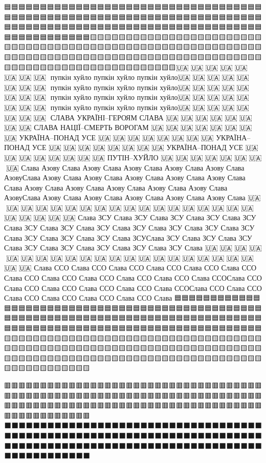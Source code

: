  
 
 
 
 

🟦🟦🟦🟦🟦🟦🟦🟦🟦🟦🟦🟦🟦🟦🟦🟦🟦🟦🟦🟦🟦🟦🟦🟦🟦🟦🟦🟦🟦🟦🟦🟦🟦🟦🟦🟦🟦🟦🟦🟦🟦🟦🟦🟦🟦🟦🟦🟦🟦🟦🟦🟦🟦🟦🟦🟦🟦🟦🟦🟦🟦🟦🟦🟦🟦🟦🟦🟦🟦🟦🟦🟦🟦🟦🟦🟦🟦🟦🟦🟦🟦🟦🟦🟦🟦🟦🟦🟦🟦🟦🟦🟦🟦🟦🟦🟦🟦🟦🟦🟦🟦🟦🟦🟦🟦🟦🟦🟦🟦🟦🟦🟦🟦🟦🟦🟦🟦🟦🟦🟦🟨🟨🟨🟨🟨🟨🟨🟨🟨🟨🟨🟨🟨🟨🟨🟨🟨🟨🟨🟨🟨🟨🟨🟨🟨🟨🟨🟨🟨🟨🟨🟨🟨🟨🟨🟨🟨🟨🟨🟨🟨🟨🟨🟨🟨🟨🟨🟨🟨🟨🟨🟨🟨🟨🟨🟨🟨🟨🟨🟨🟨🟨🟨🟨🟨🟨🟨🟨🟨🟨🟨🟨🟨🟨🟨🟨🟨🟨🟨🟨🟨🟨🟨🟨🟨🟨🟨🟨🟨🟨🟨🟨🟨🟨🟨🟨🟨🟨🟨🟨🟨🟨🟨🟨🟨🟨🟨🟨🟨🟨🟨🟨🟨🟨🟨🟨🟨🟨🟨🟨🇺🇦🔱🇺🇦🔱🇺🇦🔱🇺🇦🔱🇺🇦🔱🇺🇦🔱🇺🇦🔱🇺🇦🔱 пупкін хуйло пупкін хуйло пупкін хуйло🇺🇦🔱🇺🇦🔱🇺🇦🔱🇺🇦🔱🇺🇦🔱🇺🇦🔱🇺🇦🔱🇺🇦🔱 пупкін хуйло пупкін хуйло пупкін хуйло🇺🇦🔱🇺🇦🔱🇺🇦🔱🇺🇦🔱🇺🇦🔱🇺🇦🔱🇺🇦🔱🇺🇦🔱 пупкін хуйло пупкін хуйло пупкін хуйло🇺🇦🔱🇺🇦🔱🇺🇦🔱🇺🇦🔱🇺🇦🔱🇺🇦🔱🇺🇦🔱🇺🇦🔱 пупкін хуйло пупкін хуйло пупкін хуйло🇺🇦🔱🇺🇦🔱🇺🇦🔱🇺🇦🔱🇺🇦🔱🇺🇦🔱🇺🇦🔱🇺🇦🔱
 СЛАВА УКРАЇНІ–ГЕРОЯМ СЛАВА             🇺🇦🔱🇺🇦🔱🇺🇦🔱🇺🇦🔱🇺🇦🔱🇺🇦🔱🇺🇦🔱🇺🇦
СЛАВА НАЦІЇ–СМЕРТЬ ВОРОГАМ
🇺🇦🔱🇺🇦🔱🇺🇦🔱🇺🇦🔱🇺🇦🔱🇺🇦🔱🇺🇦🔱🇺🇦
УКРАЇНА–ПОНАД УСЕ
🇺🇦🔱🇺🇦🔱🇺🇦🔱🇺🇦🔱🇺🇦🔱🇺🇦🔱🇺🇦🔱🇺🇦
УКРАЇНА–ПОНАД УСЕ
🇺🇦🔱🇺🇦🔱🇺🇦🔱🇺🇦🔱🇺🇦🔱🇺🇦🔱🇺🇦🔱🇺🇦
УКРАЇНА–ПОНАД УСЕ
🇺🇦🔱🇺🇦🔱🇺🇦🔱🇺🇦🔱🇺🇦🔱🇺🇦🔱🇺🇦🔱🇺🇦
ПУТІН–ХУЙЛО
🇺🇦🔱🇺🇦🔱🇺🇦🔱🇺🇦🔱🇺🇦🔱🇺🇦🔱🇺🇦🔱🇺🇦
Слава Азову Слава Азову  Слава Азову Слава Азову Слава Азову Слава АзовуСлава Азову Слава Азову Слава Азову Слава Азову Слава Азову Слава Слава Азову Слава Азову Слава Азову Слава Азову Слава Азову Слава АзовуСлава Азову Слава Азову Слава Азову Слава Азову Слава Азову Слава
🇺🇦🔱🇺🇦🔱🇺🇦🔱🇺🇦🔱🇺🇦🔱🇺🇦🔱🇺🇦🔱🇺🇦🔱🇺🇦🔱🇺🇦🔱🇺🇦🔱🇺🇦🔱🇺🇦🔱🇺🇦🔱🇺🇦🔱🇺🇦🔱🇺🇦🔱🇺🇦🔱🇺🇦🔱🇺🇦🔱🇺🇦🔱🇺🇦🔱🇺🇦
Слава ЗСУ Слава ЗСУ Слава ЗСУ Слава ЗСУ Слава ЗСУ Слава ЗСУ Слава ЗСУ Слава ЗСУ Слава ЗСУ Слава ЗСУ Слава ЗСУ Слава ЗСУ Слава ЗСУ Слава ЗСУ Слава ЗСУ Слава ЗСУСлава ЗСУ Слава ЗСУ Слава ЗСУ Слава ЗСУ Слава ЗСУ Слава ЗСУ Слава ЗСУ Слава ЗСУ Слава
🇺🇦🔱🇺🇦🔱🇺🇦🔱🇺🇦🔱🇺🇦🔱🇺🇦🔱🇺🇦🔱🇺🇦🔱🇺🇦🔱🇺🇦🔱🇺🇦🔱🇺🇦🔱🇺🇦🔱🇺🇦🔱🇺🇦🔱🇺🇦🔱🇺🇦🔱🇺🇦🔱🇺🇦🔱🇺🇦🔱🇺🇦🔱🇺🇦🔱🇺🇦
Слава ССО Слава ССО Слава ССО Слава ССО Слава ССО Слава ССО Слава ССО Слава ССО Слава ССО Слава ССО Слава ССО Слава ССОСлава ССО Слава ССО Слава ССО Слава ССО Слава ССО Слава ССОСлава ССО Слава ССО Слава ССО Слава ССО Слава ССО Слава ССО Слава
🟦🟦🟦🟦🟦🟦🟦🟦🟦🟦🟦🟦🟦🟦🟦🟦🟦🟦🟦🟦🟦🟦🟦🟦🟦🟦🟦🟦🟦🟦🟦🟦🟦🟦🟦🟦🟦🟦🟦🟦🟦🟦🟦🟦🟦🟦🟦🟦🟦🟦🟦🟦🟦🟦🟦🟦🟦🟦🟦🟦🟦🟦🟦🟦🟦🟦🟦🟦🟦🟦🟦🟦🟦🟦🟦🟦🟦🟦🟦🟦🟦🟦🟦🟦🟦🟦🟦🟦🟦🟦🟦🟦🟦🟦🟦🟦🟦🟦🟦🟦🟦🟦🟦🟦🟦🟦🟦🟦🟦🟦🟦🟦🟦🟦🟦🟦🟦🟦🟦🟦🟨🟨🟨🟨🟨🟨🟨🟨🟨🟨🟨🟨🟨🟨🟨🟨🟨🟨🟨🟨🟨🟨🟨🟨🟨🟨🟨🟨🟨🟨🟨🟨🟨🟨🟨🟨🟨🟨🟨🟨🟨🟨🟨🟨🟨🟨🟨🟨🟨🟨🟨🟨🟨🟨🟨🟨🟨🟨🟨🟨🟨🟨🟨🟨🟨🟨🟨🟨🟨🟨🟨🟨🟨🟨🟨🟨🟨🟨🟨🟨🟨🟨🟨🟨🟨🟨🟨🟨🟨🟨🟨🟨🟨🟨🟨🟨🟨🟨🟨🟨🟨🟨🟨🟨🟨🟨🟨🟨🟨🟨🟨🟨🟨🟨🟨🟨🟨🟨🟨🟨

🟥🟥🟥🟥🟥🟥🟥🟥🟥🟥🟥🟥🟥🟥🟥🟥🟥🟥🟥🟥🟥🟥🟥🟥🟥🟥🟥🟥🟥🟥🟥🟥🟥🟥🟥🟥🟥🟥🟥🟥🟥🟥🟥🟥🟥🟥🟥🟥🟥🟥🟥🟥🟥🟥🟥🟥🟥🟥🟥🟥🟥🟥🟥🟥🟥🟥🟥🟥🟥🟥🟥🟥🟥🟥🟥🟥🟥🟥🟥🟥🟥🟥🟥🟥🟥🟥🟥🟥🟥🟥🟥🟥🟥🟥🟥🟥🟥🟥🟥🟥🟥🟥🟥🟥🟥🟥🟥🟥🟥🟥🟥🟥🟥🟥🟥🟥🟥🟥🟥🟥⬛️⬛️⬛️⬛️⬛️⬛️⬛️⬛️⬛️⬛️⬛️⬛️⬛️⬛️⬛️⬛️⬛️⬛️⬛️⬛️⬛️⬛️⬛️⬛️⬛️⬛️⬛️⬛️⬛️⬛️⬛️⬛️⬛️⬛️⬛️⬛️⬛️⬛️⬛️⬛️⬛️⬛️⬛️⬛️⬛️⬛️⬛️⬛️⬛️⬛️⬛️⬛️⬛️⬛️⬛️⬛️⬛️⬛️⬛️⬛️⬛️⬛️⬛️⬛️⬛️⬛️⬛️⬛️⬛️⬛️⬛️⬛️⬛️⬛️⬛️⬛️⬛️⬛️⬛️⬛️⬛️⬛️⬛️⬛️⬛️⬛️⬛️⬛️⬛️⬛️⬛️⬛️⬛️⬛️⬛️⬛️⬛️⬛️⬛️⬛️⬛️⬛️⬛️⬛️⬛️⬛️⬛️⬛️⬛️⬛️⬛️⬛️⬛️⬛️⬛️⬛️⬛️⬛️⬛️⬛️

